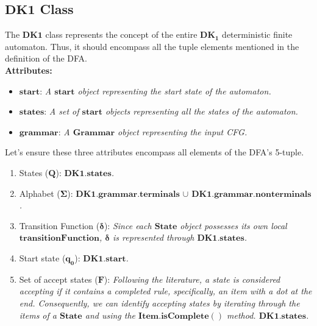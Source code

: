 \vspace{10pt}

\subsection*{\(\boldsymbol{DK1}\) Class}

The \(\boldsymbol{DK1}\) class represents the concept of the entire \(\boldsymbol{DK_{1}}\) deterministic finite automaton. Thus, it should encompass all the tuple elements mentioned in the definition of the DFA.\\

\textbf{Attributes:}
\begin{itemize}
    \item \(\boldsymbol{start}\): \textit{A \(\boldsymbol{start}\) object representing the start state of the automaton.}
    \item \(\boldsymbol{states}\): \textit{A set of \(\boldsymbol{start}\) objects representing all the states of the automaton.}
    \item \(\boldsymbol{grammar}\): \textit{A \(\boldsymbol{Grammar}\) object representing the input CFG.}
\end{itemize}

Let's ensure these three attributes encompass all elements of the DFA's 5-tuple.

\begin{enumerate}
    \item States (\(\boldsymbol{Q}\)):  \textit{\(\boldsymbol{DK1.states}\).}
    \item Alphabet (\(\boldsymbol{\Sigma}\)):  \textit{\(\boldsymbol{DK1.grammar.terminals}\) \(\cup\) \(\boldsymbol{DK1.grammar.nonterminals}\).}
    \item Transition Function (\(\boldsymbol{\delta}\)):  \textit{Since each \(\boldsymbol{State}\) object possesses its own local \(\boldsymbol{transitionFunction}\), \(\boldsymbol{\delta}\) is represented through \(\boldsymbol{DK1.states}\).}
    \item Start state (\(\boldsymbol{q_{0}}\)):  \textit{\(\boldsymbol{DK1.start}\).}
    \item Set of accept states (\(\boldsymbol{F}\)):  \textit{Following the literature, a state is considered accepting if it contains a completed rule, specifically, an item with a dot at the end. Consequently, we can identify accepting states by iterating through the items of a \(\boldsymbol{State}\) and using the \(\boldsymbol{Item.isComplete()}\) method. \(\boldsymbol{DK1.states}\).}
\end{enumerate}

